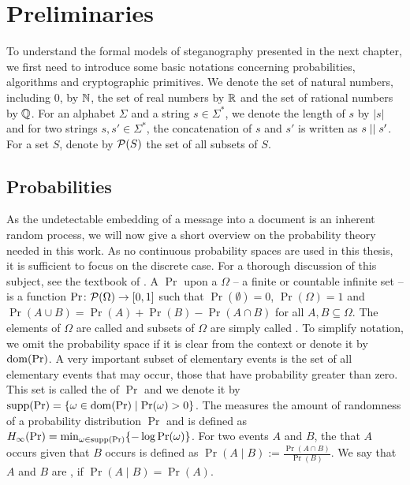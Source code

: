 \chapter{Preliminaries}
To understand the formal models of steganography presented in the next
chapter, we first need to introduce some basic notations concerning
probabilities, algorithms and cryptographic primitives. We denote the
set of natural numbers, including $0$, by $\mathbb{N}$, the set of real
numbers by $\mathbb{R}$ and the set of rational numbers by $\mathbb{Q}$. For an
alphabet $\Sigma$ and a string $s\in \Sigma^{*}$, we denote the length
of $s$ by $|s|$ and for two strings $s,s'\in \Sigma^{*}$, the
concatenation of $s$ and $s'$ is written as $s\mid \mid s'$. For a set
$S$, denote by $\mathcal{P}(S)$ the set of all subsets of $S$. 



\section{Probabilities}
As the undetectable embedding of a message into a document is an
inherent random process, we will now give a short overview on the
probability theory needed in this work. As no continuous probability
spaces are used in this thesis, it is sufficient to focus on the
discrete case. For a thorough discussion of this subject, see \eg the
textbook of \citeauthor{mitzenmacher2005probability}
\cite{mitzenmacher2005probability}. A
 $\Pr$ upon a 
$\Omega$ -- a finite or countable infinite set -- is a function
$\Pr\colon\mathcal{P}(\Omega)\to [0,1]$ such that $\Pr(\emptyset)=0$,
$\Pr(\Omega)=1$ and $\Pr(A\cup B)=\Pr(A)+\Pr(B)-\Pr(A\cap B)$ for all
$A,B\subseteq \Omega$. The elements of $\Omega$ are called
 and subsets of $\Omega$ are simply called
. To simplify notation, we omit the probability space if
it is clear from the context or denote it by $\operatorname{dom}(\Pr)$. A very
important subset of elementary events is the set of all elementary
events that may occur, \ie those that have probability greater than
zero. This set is called the  of $\Pr$ and we denote it
by $\operatorname{supp}(\Pr)=\{\omega\in \operatorname{dom}(\Pr)\mid \Pr(\omega) > 0\}$. The
 measures the amount of randomness of a probability
distribution $\Pr$ and is defined as
$H_{\infty}(\Pr)=\min_{\omega\in \operatorname{supp}(\Pr)}\{-\log \Pr(\omega)\}$. For two
events $A$ and $B$, the  that $A$ occurs
given that $B$ occurs is defined as
$\Pr(A\mid B) := \frac{\Pr(A\cap B)}{\Pr(B)}$. We say that $A$ and $B$
are , if $\Pr(A\mid B)=\Pr(A)$.

